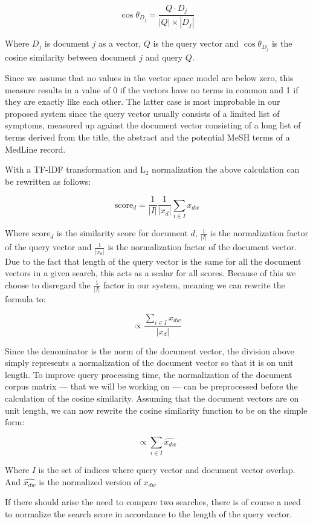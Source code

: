 \[
\cos \theta_{D_j} = \frac{Q \cdot D_j}{|Q| \times |D_j|}
\]

Where $D_j$ is document $j$ as a vector, $Q$ is the query vector and
$\cos \theta_{D_{j}}$ is the cosine similarity between document $j$ and
query $Q$.

Since we assume that no values in the vector space model are
below zero, this measure results in a value of 0 if the vectors have
no terms in common and 1 if they are exactly like each other. The
latter case is most improbable in our proposed system since the query
vector usually consists of a limited list of symptoms, measured up
against the document vector consisting of a long list of terms derived
from the title, the abstract and the potential MeSH terms of a MedLine
record.

With a TF-IDF transformation and L$_2$ normalization the above
calculation can be rewritten as follows: 

\[
\textrm{score}_{d} = \frac{1}{|I|}\frac{1}{|x_{d}|} \sum_{i \in I} x_{dw}
\]

Where $\textrm{score}_{d}$ is the similarity score for document $d$,
$\frac{1}{|I|}$ is the normalization factor of the query vector and
$\frac{1}{|x_{d}|}$ is the normalization factor of the document
vector. Due to the fact that length of the query vector is the same
for all the document vectors in a given search, this acts as a scalar
for all scores. Because of this we choose to disregard the
$\frac{1}{|I|}$ factor in our system, meaning we can rewrite the
formula to:

\[
\propto \frac{\sum_{i \in I} x_{dw}} {|x_{d}|}
\]

Since the denominator is the norm of the document vector, the division
above simply represents a normalization of the document vector so that
it is on unit length. To improve query processing time, the
normalization of the document corpus matrix --- that we will be working
on --- can be preprocessed before the calculation of the cosine
similarity. Assuming that the document vectors are on unit length, we
can now rewrite the cosine similarity function to be on the simple
form: 

\[
\propto  \sum_{i \in I} \widehat{x_{dw}}
\]

Where $I$ is the set of indices where query vector and document vector
overlap. And $\widehat{x_{dw}}$ is the normalized version of $x_{dw}$

If there should arise the need to compare two searches, there is of
course a need to normalize the search score in accordance to the
length of the query vector.

